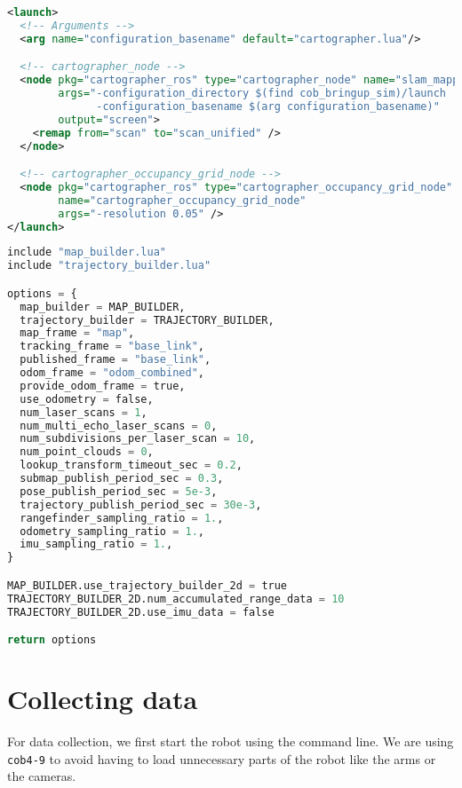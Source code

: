 \begin{lstlisting}[caption={Cartographer launch file.},label={lst:cartographer},language=XML]
<launch>
  <!-- Arguments -->
  <arg name="configuration_basename" default="cartographer.lua"/>

  <!-- cartographer_node -->
  <node pkg="cartographer_ros" type="cartographer_node" name="slam_mapping"
        args="-configuration_directory $(find cob_bringup_sim)/launch
              -configuration_basename $(arg configuration_basename)"
        output="screen">
    <remap from="scan" to="scan_unified" />
  </node>

  <!-- cartographer_occupancy_grid_node -->
  <node pkg="cartographer_ros" type="cartographer_occupancy_grid_node"
        name="cartographer_occupancy_grid_node"
        args="-resolution 0.05" />
</launch>
\end{lstlisting}

\begin{lstlisting}[caption={Cartographer Lua configuration.},label={lst:cartographer_lua},language=Python]
include "map_builder.lua"
include "trajectory_builder.lua"

options = {
  map_builder = MAP_BUILDER,
  trajectory_builder = TRAJECTORY_BUILDER,
  map_frame = "map",
  tracking_frame = "base_link",
  published_frame = "base_link",
  odom_frame = "odom_combined",
  provide_odom_frame = true,
  use_odometry = false,
  num_laser_scans = 1,
  num_multi_echo_laser_scans = 0,
  num_subdivisions_per_laser_scan = 10,
  num_point_clouds = 0,
  lookup_transform_timeout_sec = 0.2,
  submap_publish_period_sec = 0.3,
  pose_publish_period_sec = 5e-3,
  trajectory_publish_period_sec = 30e-3,
  rangefinder_sampling_ratio = 1.,
  odometry_sampling_ratio = 1.,
  imu_sampling_ratio = 1.,
}

MAP_BUILDER.use_trajectory_builder_2d = true
TRAJECTORY_BUILDER_2D.num_accumulated_range_data = 10
TRAJECTORY_BUILDER_2D.use_imu_data = false

return options
\end{lstlisting}

\section{Collecting data} \label{sec:collecting_data}

For data collection, we first start the robot using the command line. We are using \texttt{cob4-9} to avoid having to load unnecessary parts of the robot like the arms or the cameras.

